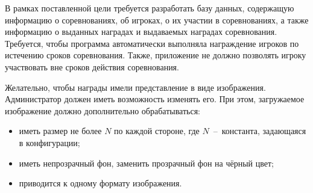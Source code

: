 



В рамках поставленной цели требуется разработать базу данных, содержащую информацию о соревнованиях, об игроках, о их участии в соревнованиях, а также информацию о выданных наградах и выдаваемых наградах соревнования. Требуется, чтобы программа автоматически выполняла награждение игроков по истечению сроков соревнования. Также, приложение не должно позволять игроку участвовать вне сроков действия соревнования. 

Желательно, чтобы награды имели представление в виде изображения. Администратор должен иметь возможность изменять его. При этом, загружаемое изображение должно дополнительно обрабатываться:
\begin{itemize}
	\item иметь размер не более $N$ по каждой стороне, где $N$~--~константа, задающаяся в конфигурации;
	\item иметь непрозрачный фон, заменить прозрачный фон на чёрный цвет;
	\item приводится к одному формату изображения.
\end{itemize}



